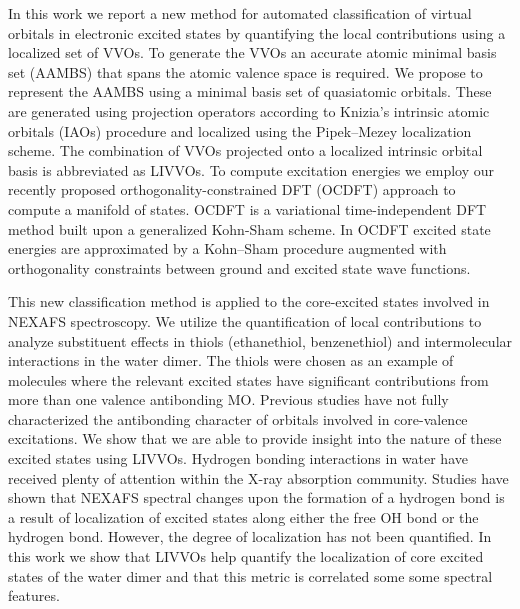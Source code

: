 \documentclass{article}
\begin{document}
In this work we report a new method for automated classification of virtual orbitals in electronic excited states by quantifying the local contributions using a localized set of VVOs.
To generate the VVOs an accurate atomic minimal basis set (AAMBS) that spans the atomic valence space is required. We propose to represent the AAMBS using a minimal basis set of quasiatomic orbitals.\cite{lu_molecule_2004}
These are generated using projection operators according to Knizia's intrinsic atomic orbitals (IAOs) procedure\cite{knizia_intrinsic_2013} and localized using the Pipek--Mezey localization scheme. \cite{pipek_fast_1989}
The combination of VVOs projected onto a localized intrinsic orbital basis is abbreviated as LIVVOs.
To compute excitation energies we employ our recently proposed orthogonality-constrained DFT (OCDFT) approach\cite{evangelista_orthogonality_2013} to compute a manifold of states.\cite{derricotte_simulation_2015}
OCDFT is a variational time-independent DFT method built upon a generalized Kohn-Sham scheme.
In OCDFT excited state energies are approximated by a Kohn--Sham procedure augmented with orthogonality constraints between ground and excited state wave functions.

This new classification method is applied to the core-excited states involved in NEXAFS spectroscopy. We utilize the quantification of local contributions to analyze substituent effects in  thiols (ethanethiol, benzenethiol) and intermolecular interactions in the water dimer. The thiols were chosen as an example of molecules where the relevant excited states have significant contributions from more than one valence antibonding MO. Previous studies have not fully characterized the antibonding character of orbitals involved in core-valence excitations.\cite{behyan_chemical_2014,behyan_sulfur_2013,behyan_sulfur_2011}  We show that we are able to provide insight into the nature of these excited states using LIVVOs. Hydrogen bonding interactions in water have received plenty of attention within the X-ray absorption community.\cite{wernet_structure_2004,cavalleri_interpretation_2002,smith_probing_2006,prendergast_x-ray_2006-2,iannuzzi_x-ray_2008,leetmaa_theoretical_2010,kuhne_nature_2014}
Studies have shown that NEXAFS spectral changes upon the formation of a hydrogen bond is a result of localization of excited states along either the free OH bond or the hydrogen bond.\cite{smith_probing_2006,prendergast_x-ray_2006-2,kuhne_nature_2014,tse_x-ray_2008,smith_energetics_2004,smith_response_2005,chen_x-ray_2010,clark_structure_2010,vinson_theoretical_2012}
However, the degree of localization has not been quantified.  In this work we show that LIVVOs help quantify the localization of core excited states of the water dimer and that this metric is correlated some some spectral features.
\end{document}
